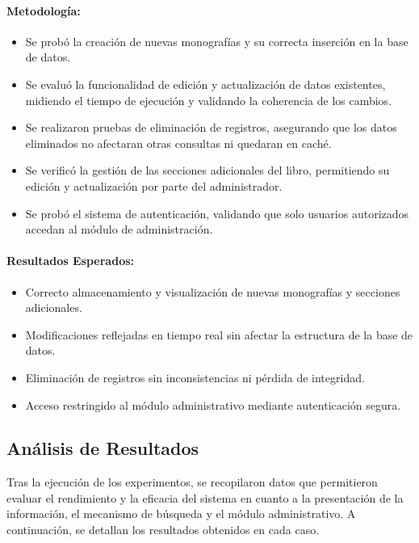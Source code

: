\paragraph{Metodología:}
\begin{itemize}
    \item Se probó la creación de nuevas monografías y su correcta inserción en la base de datos.
    \item Se evaluó la funcionalidad de edición y actualización de datos existentes, midiendo el tiempo de ejecución y validando la coherencia de los cambios.
    \item Se realizaron pruebas de eliminación de registros, asegurando que los datos eliminados no afectaran otras consultas ni quedaran en caché.
    \item Se verificó la gestión de las secciones adicionales del libro, permitiendo su edición y actualización por parte del administrador.
    \item Se probó el sistema de autenticación, validando que solo usuarios autorizados accedan al módulo de administración.
\end{itemize}
\paragraph{Resultados Esperados:}
\begin{itemize}
    \item Correcto almacenamiento y visualización de nuevas monografías y secciones adicionales.
    \item Modificaciones reflejadas en tiempo real sin afectar la estructura de la base de datos.
    \item Eliminación de registros sin inconsistencias ni pérdida de integridad.
    \item Acceso restringido al módulo administrativo mediante autenticación segura.
\end{itemize}



\subsection{Análisis de Resultados}
Tras la ejecución de los experimentos, se recopilaron datos que permitieron evaluar el rendimiento y la eficacia del sistema en cuanto 
a la presentación de la información, el mecanismo de búsqueda y el módulo administrativo. A continuación, se detallan los resultados 
obtenidos en cada caso.

